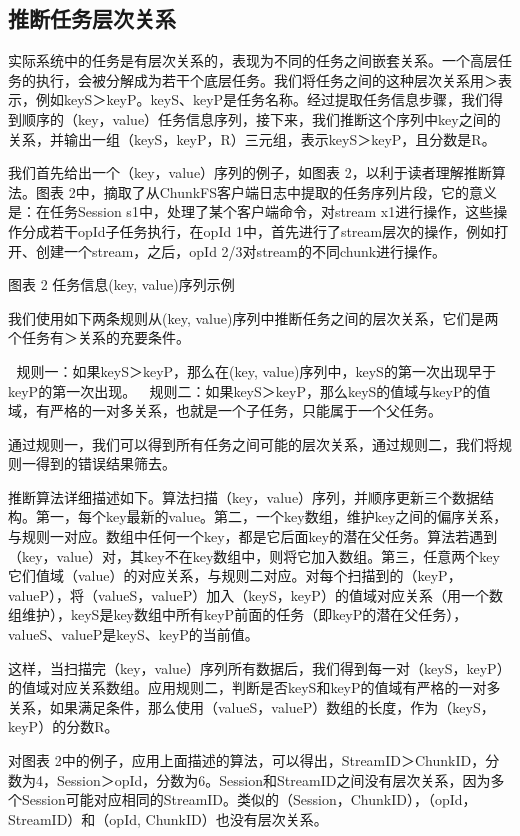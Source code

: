 \subsection{推断任务层次关系}

实际系统中的任务是有层次关系的，表现为不同的任务之间嵌套关系。一个高层任务的执行，会被分解成为若干个底层任务。我们将任务之间的这种层次关系用＞表示，例如keyS＞keyP。keyS、keyP是任务名称。经过提取任务信息步骤，我们得到顺序的（key，value）任务信息序列，接下来，我们推断这个序列中key之间的关系，并输出一组（keyS，keyP，R）三元组，表示keyS＞keyP，且分数是R。

我们首先给出一个（key，value）序列的例子，如图表 2，以利于读者理解推断算法。图表 2中，摘取了从ChunkFS客户端日志中提取的任务序列片段，它的意义是：在任务Session s1中，处理了某个客户端命令，对stream x1进行操作，这些操作分成若干opId子任务执行，在opId 1中，首先进行了stream层次的操作，例如打开、创建一个stream，之后，opId 2/3对stream的不同chunk进行操作。
 
图表 2 任务信息(key, value)序列示例

我们使用如下两条规则从(key, value)序列中推断任务之间的层次关系，它们是两个任务有＞关系的充要条件。

	规则一：如果keyS＞keyP，那么在(key, value)序列中，keyS的第一次出现早于keyP的第一次出现。
	规则二：如果keyS＞keyP，那么keyS的值域与keyP的值域，有严格的一对多关系，也就是一个子任务，只能属于一个父任务。

通过规则一，我们可以得到所有任务之间可能的层次关系，通过规则二，我们将规则一得到的错误结果筛去。

推断算法详细描述如下。算法扫描（key，value）序列，并顺序更新三个数据结构。第一，每个key最新的value。第二，一个key数组，维护key之间的偏序关系，与规则一对应。数组中任何一个key，都是它后面key的潜在父任务。算法若遇到（key，value）对，其key不在key数组中，则将它加入数组。第三，任意两个key它们值域（value）的对应关系，与规则二对应。对每个扫描到的（keyP，valueP），将（valueS，valueP）加入（keyS，keyP）的值域对应关系（用一个数组维护），keyS是key数组中所有keyP前面的任务（即keyP的潜在父任务），valueS、valueP是keyS、keyP的当前值。

这样，当扫描完（key，value）序列所有数据后，我们得到每一对（keyS，keyP）的值域对应关系数组。应用规则二，判断是否keyS和keyP的值域有严格的一对多关系，如果满足条件，那么使用（valueS，valueP）数组的长度，作为（keyS，keyP）的分数R。

对图表 2中的例子，应用上面描述的算法，可以得出，StreamID＞ChunkID，分数为4，Session＞opId，分数为6。Session和StreamID之间没有层次关系，因为多个Session可能对应相同的StreamID。类似的（Session，ChunkID），（opId，StreamID）和（opId, ChunkID）也没有层次关系。

